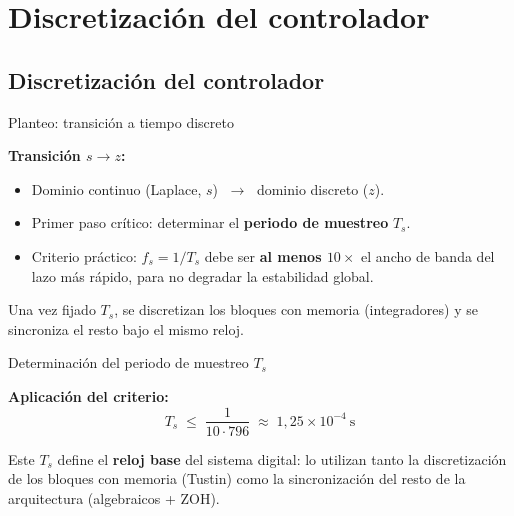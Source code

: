 \documentclass[aspectratio=169,t]{beamer}
\newcommand{\SecPresentacion}{Presentación del problema}
\newcommand{\SecMecanico}{Subsistema mecánico equivalente}
\newcommand{\SecElectromagnetico}{Subsistema electromagnético en coordenadas qd0}
\newcommand{\SecTermico}{Subsistema térmico}
\newcommand{\SecNLGlobal}{Sistema No Lineal Global}
\newcommand{\SecLPV}{Linealización Jacobiana (LPV)}
\newcommand{\SecLTI}{Obtención del modelo LTI equivalente}
\newcommand{\SecAnalisisLTI}{Análisis del modelo LTI aumentado}
\newcommand{\SecDinamica}{Respuesta dinámica en dominio del tiempo}
\newcommand{\SecControlador}{Diseño y análisis del controlador en cascada}
\newcommand{\SecVerifSpecs}{Verificación de desempeño: Especificaciones de operación}
\newcommand{\SecVerifOffset}{Verificación de desempeño: Offset de estado estacionario}
\newcommand{\SecVerifNoIdealidades}{Verificación de desempeño: No idealidades y comportamiento térmico}
\newcommand{\SecDiscretizacion}{Discretización del controlador}
\newcommand{\SecSoftware}{Codificación del software de control}
\newcommand{\AgendaItem}[3]{%
  \ifnum#1=#2
    {\scriptsize\bfseries\color{uncBlue}%
      \hyperlink{sec:#1}{\makebox[2.2em][r]{#1.}\hspace{0.7em}%
      \parbox[t]{0.86\textwidth}{#3}}\par}%
  \else
    {\scriptsize\color{black!26}%
      \hyperlink{sec:#1}{\makebox[2.2em][r]{#1.}\hspace{0.7em}%
      \parbox[t]{0.86\textwidth}{#3}}\par}%
  \fi
  \vspace{0.35mm}%
}
\newcommand{\AgendaBody}[1]{%
    \vspace{3mm}
    {\Large\bfseries\color{uncBlue}Tabla de contenidos\par}
    \vspace{2mm}
    \begin{minipage}{0.94\textwidth}
      \AgendaItem{1}{#1}{\SecPresentacion}
      \AgendaItem{2}{#1}{\SecMecanico}
      \AgendaItem{3}{#1}{\SecElectromagnetico}
      \AgendaItem{4}{#1}{\SecTermico}
      \AgendaItem{5}{#1}\SecNLGlobal
      \AgendaItem{6}{#1}{\SecLPV}
      \AgendaItem{7}{#1}{\SecLTI}
      \AgendaItem{8}{#1}{\SecAnalisisLTI}
      \AgendaItem{9}{#1}{\SecDinamica}
      \AgendaItem{10}{#1}{\SecControlador}
      \AgendaItem{11}{#1}{\SecVerifSpecs}
      \AgendaItem{12}{#1}{\SecVerifOffset}
      \AgendaItem{13}{#1}{\SecVerifNoIdealidades}
      \AgendaItem{14}{#1}{\SecDiscretizacion}
      \AgendaItem{15}{#1}{\SecSoftware}
    \end{minipage}
    \vfill
}
\newcommand{\AgendaSlideTarget}[2]{%
  \begin{frame}[plain]
    \hypertarget{#2}{}%
    \AgendaBody{#1}
  \end{frame}
}
\newcommand{\StartProjectSection}[2]{%
  \section{#2}%
  \subsection{#2}%
  \AgendaSlideTarget{#1}{sec:#1}%
}
\begin{document}

\StartProjectSection{14}{\SecDiscretizacion}

\begin{frame}{Planteo: transición a tiempo discreto}
\vspace{6mm}

\textbf{Transición $s \to z$:}
\begin{itemize}
\item Dominio continuo (Laplace, $s$) $\;\longrightarrow\;$ dominio discreto ($z$).
\item Primer paso crítico: determinar el \textbf{periodo de muestreo} $T_s$.
\item Criterio práctico: $f_s = 1/T_s$ debe ser \textbf{al menos $10\times$} el ancho de banda del lazo más rápido, para no degradar la estabilidad global.
\end{itemize}

\vspace{4mm}
{\small Una vez fijado $T_s$, se discretizan los bloques con memoria (integradores) y se sincroniza el resto bajo el mismo reloj.}
\end{frame}

\begin{frame}{Determinación del periodo de muestreo $T_s$}
\vspace{10mm}

\textbf{Aplicación del criterio:}
\begin{equation*}
T_s \;\leq\; \frac{1}{10\cdot 796} \;\approx\; 1{,}25\!\times\!10^{-4}~\text{s}
\end{equation*}

\vspace{8mm}
{\small Este $T_s$ define el \textbf{reloj base} del sistema digital: lo utilizan tanto la discretización de los bloques con memoria (Tustin) como la sincronización del resto de la arquitectura (algebraicos + ZOH).}
\end{frame}
\end{document}
